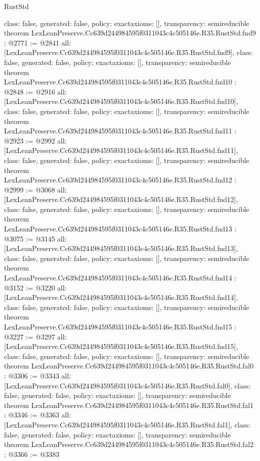 \begin{lexlean}{RustStd}
\begin{coremodule}
{  class: false,
  generated: false,
  policy: exact{axioms: []},
  transparency: semireducible
}
theorem LexLeanPreserve.Cc639d244984595f0311043c4c505146e.R35.RustStd.fnd9 : @2771 := @2841 {
  all: [LexLeanPreserve.Cc639d244984595f0311043c4c505146e.R35.RustStd.fnd9],
  class: false,
  generated: false,
  policy: exact{axioms: []},
  transparency: semireducible
}
theorem LexLeanPreserve.Cc639d244984595f0311043c4c505146e.R35.RustStd.fnd10 : @2848 := @2916 {
  all: [LexLeanPreserve.Cc639d244984595f0311043c4c505146e.R35.RustStd.fnd10],
  class: false,
  generated: false,
  policy: exact{axioms: []},
  transparency: semireducible
}
theorem LexLeanPreserve.Cc639d244984595f0311043c4c505146e.R35.RustStd.fnd11 : @2923 := @2992 {
  all: [LexLeanPreserve.Cc639d244984595f0311043c4c505146e.R35.RustStd.fnd11],
  class: false,
  generated: false,
  policy: exact{axioms: []},
  transparency: semireducible
}
theorem LexLeanPreserve.Cc639d244984595f0311043c4c505146e.R35.RustStd.fnd12 : @2999 := @3068 {
  all: [LexLeanPreserve.Cc639d244984595f0311043c4c505146e.R35.RustStd.fnd12],
  class: false,
  generated: false,
  policy: exact{axioms: []},
  transparency: semireducible
}
theorem LexLeanPreserve.Cc639d244984595f0311043c4c505146e.R35.RustStd.fnd13 : @3075 := @3145 {
  all: [LexLeanPreserve.Cc639d244984595f0311043c4c505146e.R35.RustStd.fnd13],
  class: false,
  generated: false,
  policy: exact{axioms: []},
  transparency: semireducible
}
theorem LexLeanPreserve.Cc639d244984595f0311043c4c505146e.R35.RustStd.fnd14 : @3152 := @3220 {
  all: [LexLeanPreserve.Cc639d244984595f0311043c4c505146e.R35.RustStd.fnd14],
  class: false,
  generated: false,
  policy: exact{axioms: []},
  transparency: semireducible
}
theorem LexLeanPreserve.Cc639d244984595f0311043c4c505146e.R35.RustStd.fnd15 : @3227 := @3297 {
  all: [LexLeanPreserve.Cc639d244984595f0311043c4c505146e.R35.RustStd.fnd15],
  class: false,
  generated: false,
  policy: exact{axioms: []},
  transparency: semireducible
}
theorem LexLeanPreserve.Cc639d244984595f0311043c4c505146e.R35.RustStd.fal0 : @3306 := @3343 {
  all: [LexLeanPreserve.Cc639d244984595f0311043c4c505146e.R35.RustStd.fal0],
  class: false,
  generated: false,
  policy: exact{axioms: []},
  transparency: semireducible
}
theorem LexLeanPreserve.Cc639d244984595f0311043c4c505146e.R35.RustStd.fal1 : @3346 := @3363 {
  all: [LexLeanPreserve.Cc639d244984595f0311043c4c505146e.R35.RustStd.fal1],
  class: false,
  generated: false,
  policy: exact{axioms: []},
  transparency: semireducible
}
theorem LexLeanPreserve.Cc639d244984595f0311043c4c505146e.R35.RustStd.fal2 : @3366 := @3383 {
}
\end{coremodule}
\end{lexlean}
